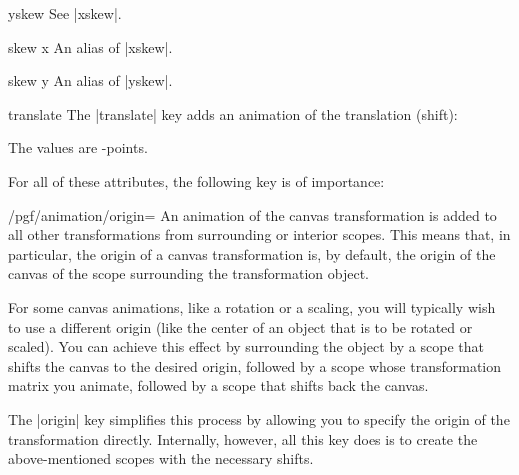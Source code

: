 \begin{animateattribute}{yskew}
  See |xskew|.
\end{animateattribute}

\begin{animateattribute}{skew x}
  An alias of |xskew|.
\end{animateattribute}

\begin{animateattribute}{skew y}
  An alias of |yskew|.
\end{animateattribute}


\begin{animateattribute}{translate}
  The |translate| key adds an animation of the translation (shift):
\begin{codeexample}[width=2.3cm]
\end{codeexample}
  The values are \pgfname-points.
\end{animateattribute}

For all of these attributes, the following key is of importance:
\begin{key}{/pgf/animation/origin=}
  An animation of the canvas transformation is added to all other
  transformations from surrounding or interior scopes. This means
  that, in particular, the origin of a canvas transformation is, by
  default, the origin of the canvas of the scope surrounding the
  transformation object.

  For some canvas animations, like a rotation or a scaling, you will
  typically wish to use a different origin (like the center of an
  object that is to be rotated or scaled). You can achieve this effect
  by surrounding the object by a scope that shifts the canvas to the
  desired origin, followed by a scope whose transformation matrix you
  animate, followed by a scope that shifts back the canvas.

  The |origin| key simplifies this process by allowing you to specify
  the origin of the transformation directly. Internally, however, all
  this key does is to create the above-mentioned scopes with the
  necessary shifts.
  
\begin{codeexample}[width=2.3cm]
\end{codeexample}
\end{key}


